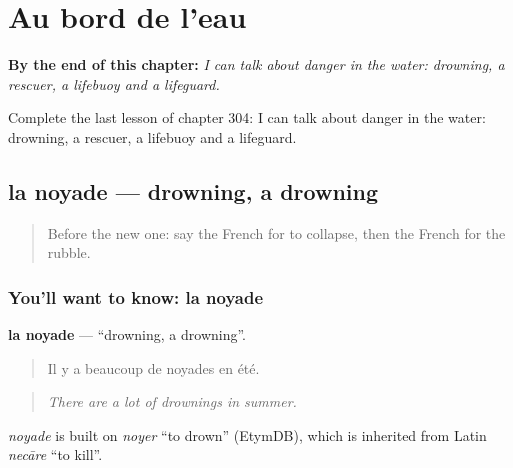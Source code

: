 
\chapter{Au bord de l'eau}
\label{ch:fr-au-bord-de-l-eau}

\begin{chapteropening}
\textbf{By the end of this chapter:} \emph{I can talk about danger in the water: drowning, a rescuer, a lifebuoy and a lifeguard.}

Complete the last lesson of chapter 304: I can talk about danger in the water: drowning, a rescuer, a lifebuoy and a lifeguard.
\end{chapteropening}

\section[la noyade]{la noyade — drowning, a drowning}

\label{lesson:FR-C304-noyade}



\begin{quote}
Before the new one: say the French for to collapse, then the French for the rubble.
\end{quote}

\subsection*{You'll want to know: la noyade}
\textbf{la noyade} — \textquotedblleft{}drowning, a drowning\textquotedblright{}.

\begin{quote}
Il y a beaucoup de noyades en été.
\end{quote}

\begin{quote}
\emph{There are a lot of drownings in summer.}
\end{quote}

\begin{cousinweb}
\emph{noyade} is built on \emph{noyer} \textquotedblleft{}to drown\textquotedblright{} (EtymDB), which is inherited from Latin \emph{necāre} \textquotedblleft{}to kill\textquotedblright{}.
\end{cousinweb}

